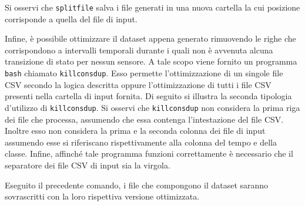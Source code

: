 Si osservi che \lstinline[]|splitfile| salva i file generati in una nuova cartella la cui posizione corrisponde a quella del file di input.

Infine, è possibile ottimizzare il dataset appena generato rimuovendo le righe che corrispondono a intervalli temporali durante i quali non è avvenuta alcuna transizione di stato per nessun sensore. A tale scopo viene fornito un programma \lstinline[]|bash| chiamato \lstinline[]|killconsdup|. Esso permette l'ottimizzazione di un singole file \acs{CSV} secondo la logica descritta oppure l'ottimizzazione di tutti i file \acs{CSV} presenti nella cartella di input fornita. Di seguito si illustra la seconda tipologia d'utilizzo di \lstinline[]|killconsdup|.
\vspace*{8pt}
Si osservi che \lstinline$killconsdup$ non considera la prima riga dei file che processa, assumendo che essa contenga l'intestazione del file \acs{CSV}. Inoltre esso non considera la prima e la seconda colonna dei file di input assumendo esse si riferiscano rispettivamente alla colonna del tempo e della classe. Infine, affinché tale programma funzioni correttamente è necessario che il separatore dei file \acs{CSV} di input sia la virgola.

Eseguito il precedente comando, i file che compongono il dataset saranno sovrascritti con la loro rispettiva versione ottimizzata.
